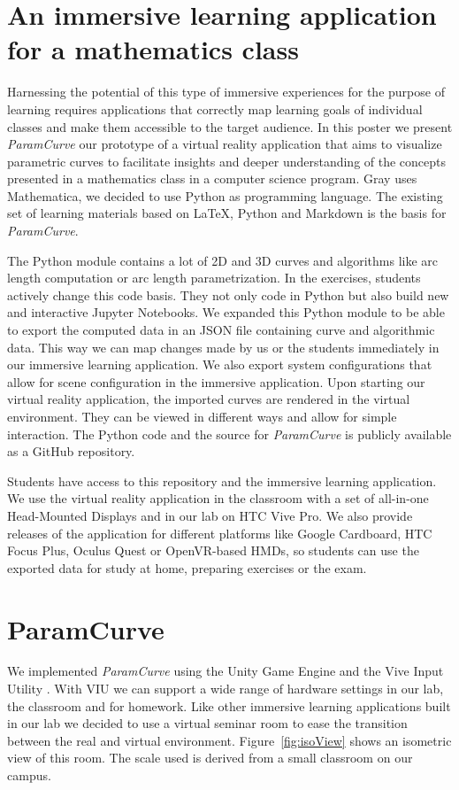 \documentclass{VRARWorkshop}
\begin{document}
\section{An immersive learning application for a mathematics class}
Harnessing the potential of this type of immersive experiences for the purpose of learning requires applications that correctly map learning goals of individual classes and make them accessible to the target audience.
In this poster we present \textit{ParamCurve} our prototype of a virtual reality application that aims to visualize parametric curves to facilitate insights and deeper understanding of the concepts presented in a mathematics class in a computer science program.
Gray \cite{gray_06} uses Mathematica, we decided to use Python as programming language.
The existing set of learning materials based on \LaTeX{}, Python and Markdown is the basis for \textit{ParamCurve}.

The Python module contains a lot of 2D and 3D curves and algorithms like arc length computation or arc length parametrization.
In the exercises, students actively change this code basis. They not only code in Python but also build new and interactive Jupyter Notebooks.
We expanded this Python module to be able to export the computed data in an JSON file containing
curve and algorithmic data.
This way we can map changes made by us or the students immediately in our immersive  learning application.
We also export system configurations that allow for scene configuration in the immersive application.
Upon starting our virtual reality application, the imported curves are rendered in the virtual environment.
They can be viewed in different ways and allow for simple interaction.
The Python code and the source for \textit{ParamCurve} is publicly available as a GitHub repository.%

Students have access to this repository and the immersive learning application.
We use the virtual reality application in the classroom with a set of all-in-one Head-Mounted Displays
and in our lab on HTC Vive Pro.
We also provide releases of the application for different platforms like Google Cardboard, HTC Focus Plus,
Oculus Quest or OpenVR-based HMDs, so students can use the exported data for study at home, preparing
exercises or the exam.

\section{ParamCurve}
We implemented \textit{ParamCurve} using the Unity Game Engine and the Vive Input Utility \cite{viu}.
With VIU we can support a wide range of hardware settings in our lab, the classroom and for homework.
Like other immersive learning applications built in our lab we decided to use a virtual seminar room to ease the transition between the real and virtual environment.
Figure~\ref{fig:isoView} shows an isometric view of this room.
The scale used is derived from a small classroom on our campus.
\end{document}
